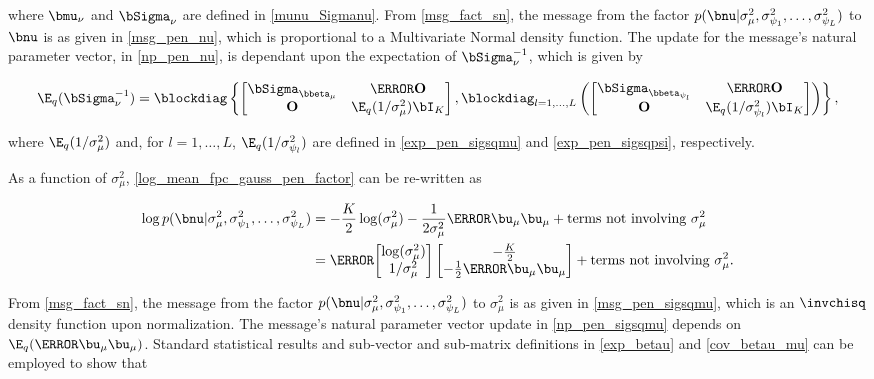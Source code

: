 \documentclass[12pt]{article}
\def\Sigmanu{\bSigma_{\nu}}
\def\munu{\bmu_{\nu}}
\def\sigsqmu{\sigma^2_{\mu}}
\def\betamu{\bbeta_\mu}
\def\umu{\bu_\mu}
\newcommand\betapsi[1]{\bbeta_{\psi_{#1}}}
\newcommand\sigsqpsi[1]{\sigma^2_{\psi_{#1}}}
\newcommand\tni[1]{\text{terms not involving $#1$}}
\theoremstyle{plain}
\theoremstyle{definition}
\theoremstyle{remark}
\begin{document}
\noindent where $\munu$ and $\Sigmanu$ are defined in \eqref{munu_Sigmanu}.
From \eqref{msg_fact_sn}, the message from the factor $p(\bnu | \sigsqmu, \sigsqpsi{1}, \dots, \sigsqpsi{L})$
to $\bnu$ is as given in \eqref{msg_pen_nu}, which is proportional to a Multivariate Normal density function.
The update for the message's natural parameter vector, in \eqref{np_pen_nu},
is dependant upon the expectation of $\Sigmanu^{-1}$, which is given by

\[
	\E_q (\Sigmanu^{-1}) =
		\blockdiag \left\{
			\begin{bmatrix}
				\bSigma_{\betamu} & \T{\textbf{O}} \\
				\textbf{O} & \E_q (1/\sigsqmu) \bI_K
			\end{bmatrix},
			\blockdiag_{l = 1, \dots, L} \left(
				\begin{bmatrix}
					\bSigma_{\betapsi{l}} & \T{\textbf{O}} \\
					\textbf{O} & \E_q (1/\sigsqpsi{l}) \bI_K
				\end{bmatrix}
			\right)
		\right\},
\]

\noindent where $\E_q (1/\sigsqmu)$ and, for $l = 1, \dots, L$, $\E_q (1/\sigsqpsi{l})$ are defined in
\eqref{exp_pen_sigsqmu} and \eqref{exp_pen_sigsqpsi}, respectively.

As a function of $\sigsqmu$, \eqref{log_mean_fpc_gauss_pen_factor} can be re-written as

\begin{align*}
	\log p(\bnu | \sigsqmu, \sigsqpsi{1}, \dots, \sigsqpsi{L})
		& = -\frac{K}{2} \log (\sigsqmu) - \frac{1}{2\sigsqmu} \T{\umu} \umu + \tni{\sigsqmu} \\
		& = \T{\begin{bmatrix}
			\log (\sigsqmu) \\
			1/\sigsqmu
		\end{bmatrix}} \begin{bmatrix}
			-\frac{K}{2} \\
			-\frac12 \T{\umu} \umu
		\end{bmatrix} + \tni{\sigsqmu}.
\end{align*}

\noindent From \eqref{msg_fact_sn}, the message from the factor $p(\bnu | \sigsqmu, \sigsqpsi{1}, \dots,
\sigsqpsi{L})$ to $\sigsqmu$ is as given in \eqref{msg_pen_sigsqmu}, which is an $\invchisq$
density function upon normalization. The message's natural parameter vector update in \eqref{np_pen_sigsqmu}
depends on $\E_q (\T{\umu} \umu)$. Standard statistical results and sub-vector and sub-matrix definitions in
\eqref{exp_betau} and \eqref{cov_betau_mu} can be employed to show that
\end{document}
